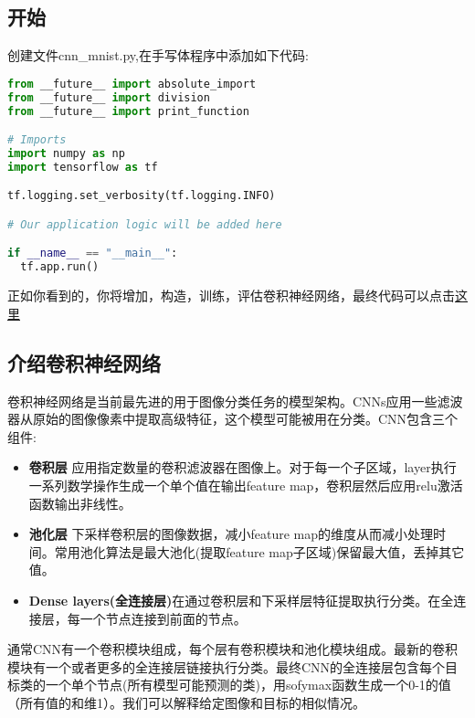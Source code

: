 \subsection{开始}
创建文件cnn\_mnist.py,在手写体程序中添加如下代码:
\begin{lstlisting}[language=Python]
from __future__ import absolute_import
from __future__ import division
from __future__ import print_function

# Imports
import numpy as np
import tensorflow as tf

tf.logging.set_verbosity(tf.logging.INFO)

# Our application logic will be added here

if __name__ == "__main__":
  tf.app.run()
\end{lstlisting}
正如你看到的，你将增加，构造，训练，评估卷积神经网络，最终代码可以点击\href{https://www.github.com/tensorflow/tensorflow/blob/r1.3/tensorflow/examples/tutorials/layers/cnn_mnist.py}{这里}
\subsection{介绍卷积神经网络}
卷积神经网络是当前最先进的用于图像分类任务的模型架构。CNNs应用一些滤波器从原始的图像像素中提取高级特征，这个模型可能被用在分类。CNN包含三个组件:
\begin{itemize}
  \item \textbf{卷积层} 应用指定数量的卷积滤波器在图像上。对于每一个子区域，layer执行一系列数学操作生成一个单个值在输出feature map，卷积层然后应用relu激活函数输出非线性。
  \item \textbf{池化层} 下采样卷积层的图像数据，减小feature map的维度从而减小处理时间。常用池化算法是最大池化(提取feature map子区域)保留最大值，丢掉其它值。
  \item \textbf{Dense layers(全连接层)}在通过卷积层和下采样层特征提取执行分类。在全连接层，每一个节点连接到前面的节点。
\end{itemize}
通常CNN有一个卷积模块组成，每个层有卷积模块和池化模块组成。最新的卷积模块有一个或者更多的全连接层链接执行分类。最终CNN的全连接层包含每个目标类的一个单个节点(所有模型可能预测的类)，用sofymax函数生成一个0-1的值（所有值的和维1）。我们可以解释给定图像和目标的相似情况。
